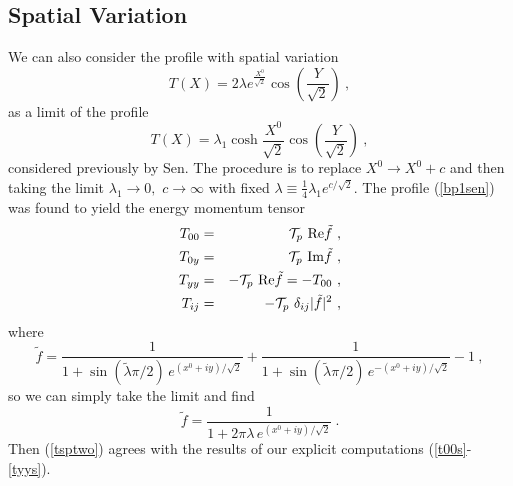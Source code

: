 \documentclass[a4paper,12pt]{article}
\begin{document}
\subsection{Spatial Variation}
We can also consider the profile with spatial variation
\begin{equation}
T(X)=2 \lambda e^{\frac{X^0}{\sqrt{2}} }
\cos (\frac{Y}{\sqrt{2}})~,
\label{bp1}
\end{equation}
as a limit of the profile 
\begin{equation}
T(X)= \lambda_1 \cosh {\frac{X^0}{\sqrt{2}} }
\cos (\frac{Y}{\sqrt{2}})~,
\label{bp1sen}
\end{equation}
considered previously by Sen. The procedure is to replace
$X^0 \rightarrow X^0+c$ and then taking the limit
$\lambda_1 \rightarrow 0, \,\, 
c \rightarrow \infty $ with fixed
$\lambda \equiv \frac{1}{4} \lambda_1 e^{c/\sqrt{2}}$. 
The
profile (\ref{bp1sen}) was found to yield the energy momentum tensor 
\begin{eqnarray}
T_{00} &=& {\cal T}_p ~ {\rm Re} \tilde{f}~, \nonumber \\
T_{0y} &=& {\cal T}_p ~ {\rm Im} \tilde{f}~, \nonumber \\
T_{yy} &=& -{\cal T}_p ~ {\rm Re} \tilde{f}=-T_{00}~, \nonumber \\
T_{ij} &=& -{\cal T}_p ~ \delta_{ij} | \tilde{f} |^2~,
\label{tsptwo}
\end{eqnarray}
where 
\begin{equation} 
\tilde{f}=\frac{1}{1+ \sin (\tilde{\lambda} \pi/2)
\, e^{(x^0+i y)/\sqrt{2}}}
+\frac{1}{1+ \sin (\tilde{\lambda} \pi/2)
\, e^{-(x^0+i y)/\sqrt{2}}}-1~,
\end{equation}
so we can simply take the limit and find
\begin{equation}
\tilde{f}=\frac{1}{1+2\pi \lambda \, e^{(x^0+i y)/\sqrt{2}}}~.
\end{equation}
Then (\ref{tsptwo}) agrees with the results of our explicit computations (\ref{t00s}-\ref{tyys}).



\end{document}
